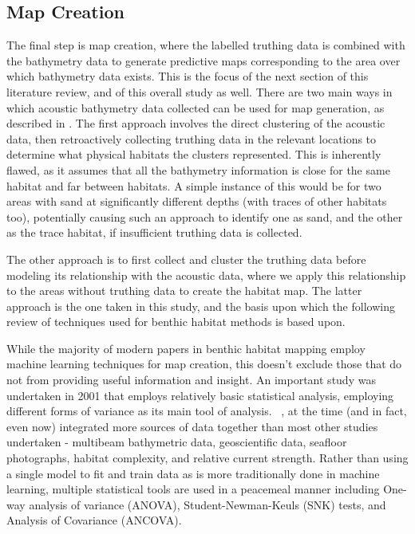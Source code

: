 \subsection{Map Creation}
The final step is map creation, where the labelled truthing data is combined with the bathymetry data to generate predictive maps corresponding to the area over which bathymetry data exists. This is the focus of the next section of this literature review, and of this overall study as well. There are two main ways in which acoustic bathymetry data collected can be used for map generation, as described in \citet{ahsan11}. The first approach involves the direct clustering of the acoustic data, then retroactively collecting truthing data in the relevant locations to determine what physical habitats the clusters represented. This is inherently flawed, as it assumes that all the bathymetry information is close for the same habitat and far between habitats. A simple instance of this would be for two areas with sand at significantly different depths (with traces of other habitats too), potentially causing such an approach to identify one as sand, and the other as the trace habitat, if insufficient truthing data is collected. 

The other approach is to first collect and cluster the truthing data before modeling its relationship with the acoustic data, where we apply this relationship to the areas without truthing data to create the habitat map. The latter approach is the one taken in this study, and the basis upon which the following review of techniques used for benthic habitat methods is based upon.



While the majority of modern papers in benthic habitat mapping employ machine learning techniques for map creation, this doesn't exclude those that do not from providing useful information and insight. An important study was undertaken in 2001 that employs relatively basic statistical analysis, employing different forms of variance as its main tool of analysis. ~\citep{kostylev01}, at the time (and in fact, even now) integrated more sources of data together than most other studies undertaken - multibeam bathymetric data, geoscientific data, seafloor photographs, habitat complexity, and relative current strength. Rather than using a single model to fit and train data as is more traditionally done in machine learning, multiple statistical tools are used in a peacemeal manner including One-way analysis of variance (ANOVA), Student-Newman-Keuls (SNK) tests, and Analysis of Covariance (ANCOVA). 

